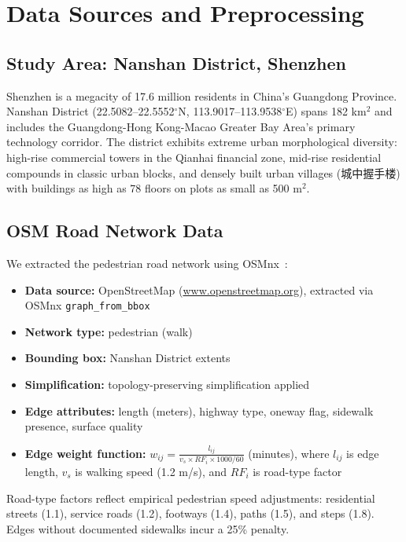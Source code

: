 \documentclass[journal]{IEEEtran}
\begin{document}
\section{Data Sources and Preprocessing}
\label{sec:data}

\subsection{Study Area: Nanshan District, Shenzhen}
Shenzhen is a megacity of 17.6 million residents in China's Guangdong Province. Nanshan District (22.5082--22.5552$^\circ$N, 113.9017--113.9538$^\circ$E) spans 182 km$^2$ and includes the Guangdong-Hong Kong-Macao Greater Bay Area's primary technology corridor. The district exhibits extreme urban morphological diversity: high-rise commercial towers in the Qianhai financial zone, mid-rise residential compounds in classic urban blocks, and densely built urban villages (城中握手楼) with buildings as high as 78 floors on plots as small as 500 m$^2$.

\subsection{OSM Road Network Data}
We extracted the pedestrian road network using OSMnx~\cite{boeing2017osmnx}:
\begin{itemize}
    \item \textbf{Data source:} OpenStreetMap (\url{www.openstreetmap.org}), extracted via OSMnx \texttt{graph\_from\_bbox}
    \item \textbf{Network type:} pedestrian (walk)
    \item \textbf{Bounding box:} Nanshan District extents
    \item \textbf{Simplification:} topology-preserving simplification applied
    \item \textbf{Edge attributes:} length (meters), highway type, oneway flag, sidewalk presence, surface quality
    \item \textbf{Edge weight function:} $w_{ij} = \frac{l_{ij}}{v_s \times RF_i \times 1000/60}$ (minutes), where $l_{ij}$ is edge length, $v_s$ is walking speed (1.2 m/s), and $RF_i$ is road-type factor
\end{itemize}

Road-type factors reflect empirical pedestrian speed adjustments: residential streets (1.1), service roads (1.2), footways (1.4), paths (1.5), and steps (1.8). Edges without documented sidewalks incur a 25\% penalty.
\end{document}
